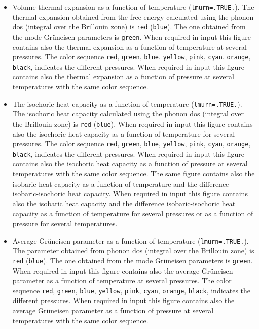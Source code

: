 \documentclass[12pt,a4paper,twoside]{report}
\begin{document}
\begin{itemize}
\item
Volume thermal expansion as a function of temperature (\texttt{lmurn=.TRUE.}). 
The thermal expansion obtained from the free energy
calculated using the phonon dos (integral over
the Brillouin zone) is \texttt{red} (\texttt{blue}).
The one obtained from the mode Gr\"uneisen parameters is 
\texttt{green}. When required in input this figure contains also the
thermal expansion as a function of temperature at several pressures.
The color sequence \texttt{red}, \texttt{green}, \texttt{blue},
\texttt{yellow}, \texttt{pink}, \texttt{cyan}, \texttt{orange}, 
\texttt{black}, indicates the different pressures.
When required in input this figure contains also the
thermal expansion as a function of pressure at several temperatures
with the same color sequence.

\item
The isochoric heat capacity as a function of temperature 
(\texttt{lmurn=.TRUE.}). 
The isochoric heat capacity calculated using the phonon dos (integral over
the Brillouin zone) is \texttt{red} (\texttt{blue}).
When required in input this figure contains also the
isochoric heat capacity as a function of temperature for
several pressures.
The color sequence \texttt{red}, \texttt{green}, \texttt{blue},
\texttt{yellow}, \texttt{pink}, \texttt{cyan}, \texttt{orange},
\texttt{black}, indicates the different pressures.
When required in input this figure contains also the
isochoric heat capacity as a function of pressure at
several temperatures with the same color sequence.
The same figure contains also the isobaric heat capacity
as a function of temperature and the difference 
isobaric-isochoric heat capacity. When required in input this figure 
contains also the isobaric heat capacity and the difference
isobaric-isochoric heat capacity as a function of temperature for
several pressures or as a function of pressure for several temperatures.

\item
Average Gr\"uneisen parameter as a function of temperature 
(\texttt{lmurn=.TRUE.}).
The parameter obtained from phonon dos (integral over
the Brillouin zone) is \texttt{red} (\texttt{blue}).
The one obtained from the mode Gr\"uneisen parameters is 
\texttt{green}. When required in input this figure contains also the
average Gr\"uneisen parameter as a function of temperature at 
several pressures.
The color sequence \texttt{red}, \texttt{green}, \texttt{blue},
\texttt{yellow}, \texttt{pink}, \texttt{cyan}, \texttt{orange}, 
\texttt{black}, indicates the different pressures.
When required in input this figure contains also the
average Gr\"uneisen parameter as a function of pressure at 
several temperatures with the same color sequence.


\end{itemize}
\end{document}
